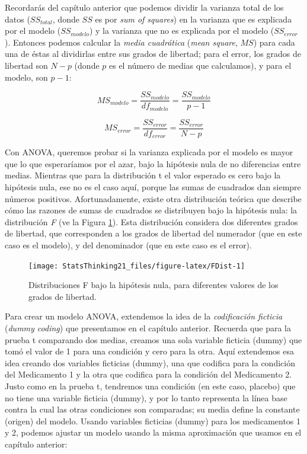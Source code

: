 \documentclass[
  12pt,
]{book}
\begin{document}
Recordarás del capítulo anterior que podemos dividir la varianza total de los datos (\(SS_{total}\), donde \(SS\) es por \emph{sum of squares}) en la varianza que es explicada por el modelo (\(SS_{modelo}\)) y la varianza que no es explicada por el modelo (\(SS_{error}\)). Entonces podemos calcular la \emph{media cuadrática} (\emph{mean square}, \(MS\)) para cada una de éstas al dividirlas entre sus grados de libertad; para el error, los grados de libertad son \(N - p\) (donde \(p\) es el número de medias que calculamos), y para el modelo, son \(p - 1\):

\[
MS_{modelo} =\frac{SS_{modelo}}{df_{modelo}}= \frac{SS_{modelo}}{p-1}
\]

\[
MS_{error} = \frac{SS_{error}}{df_{error}} = \frac{SS_{error}}{N - p}
\]

Con ANOVA, queremos probar si la varianza explicada por el modelo es mayor que lo que esperaríamos por el azar, bajo la hipótesis nula de no diferencias entre medias. Mientras que para la distribución t el valor esperado es cero bajo la hipótesis nula, ese no es el caso aquí, porque las sumas de cuadrados dan siempre números positivos. Afortunadamente, existe otra distribución teórica que describe cómo las razones de sumas de cuadrados se distribuyen bajo la hipótesis nula: la distribución \emph{F} (ve la Figura \ref{fig:FDist}). Esta distribución considera dos diferentes grados de libertad, que corresponden a los grados de libertad del numerador (que en este caso es el modelo), y del denominador (que en este caso es el error).

\begin{figure}
\texttt{[image: StatsThinking21\_files/figure-latex/FDist-1]} \caption{Distribuciones F bajo la hipótesis nula, para diferentes valores de los grados de libertad.}\label{fig:FDist}
\end{figure}

Para crear un modelo ANOVA, extendemos la idea de la \emph{codificación ficticia} (\emph{dummy coding}) que presentamos en el capítulo anterior. Recuerda que para la prueba t comparando dos medias, creamos una sola variable ficticia (dummy) que tomó el valor de 1 para una condición y cero para la otra. Aquí extendemos esa idea creando dos variables ficticias (dummy), una que codifica para la condición del Medicamento 1 y la otra que codifica para la condición del Medicamento 2. Justo como en la prueba t, tendremos una condición (en este caso, placebo) que no tiene una variable ficticia (dummy), y por lo tanto representa la línea base contra la cual las otras condiciones son comparadas; su media define la constante (origen) del modelo. Usando variables ficticias (dummy) para los medicamentos 1 y 2, podemos ajustar un modelo usando la misma aproximación que usamos en el capítulo anterior:
\end{document}
